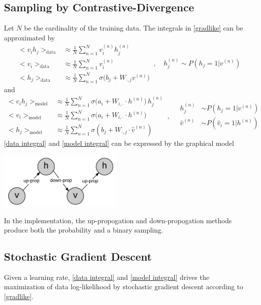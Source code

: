 \documentclass[a4paper,onecolumn]{article}
\theoremstyle{remark}
\begin{document}
\subsection{Sampling by Contrastive-Divergence}
Let $N$ be the cardinality of the training data. The integrals in \eqref{gradlike} can
be approximated by
\begin{equation}\begin{split}
    <v_i h_j>_{\textrm{data}} &\approx \frac{1}{N} \sum_{n=1}^N 
    v_i^{(n)} h_j^{(n)}\\
    <v_i>_{\textrm{data}} &\approx \frac{1}{N} \sum_{n=1}^N v_i^{(n)}\\
    <h_j>_{\textrm{data}} &\approx \frac{1}{N} \sum_{n=1}^N
    \sigma\big(b_j + W_{\cdot,j} v^{(n)}\big)
\end{split}\,,\quad
h_j^{(n)} \sim P(h_j=1\big| v^{(n)})
\label{data integral}
\end{equation}
and
\begin{equation}\begin{split}
    <v_i h_j>_{\textrm{model}} &\approx
    \frac{1}{N} \sum_{n=1}^N  \sigma \big(a_i + W_{i,\cdot}\cdot h^{(n)}\big) \, h_j^{(n)}\\
    <v_i>_{\textrm{model}} &\approx
    \frac{1}{N}\sum_{n=1}^N \sigma \big(a_i + W_{i,\cdot}\cdot h^{(n)}\big) \\
    <h_j>_{\textrm{model}} &\approx \frac{1}{N}\sum_{n=1}^N 
    \sigma(b_j + W_{\cdot, j} \cdot \hat{v}^{(n)})
\end{split}\,,\quad
\begin{split}
h_j^{(n)} &\sim P(h_j=1\big| v^{(n)})\\
\hat{v}^{(n)} &\sim P(\hat{v}_i=1\big| h^{(n)})
\end{split}
\label{model integral}
\end{equation}
\eqref{data integral} and \eqref{model integral} can be expressed by the graphical model 
\begin{center}
        \includegraphics[width=6cm]{CD1.png}
\end{center}
In the implementation, the up-propogation and down-propogation methods produce both the 
probability and a binary sampling.

\subsection{Stochastic Gradient Descent}
Given a learning rate,
\eqref{data integral} and \eqref{model integral} drives the maximization of data log-likelihood
by stochastic gradient descent according to \eqref{gradlike}.
\end{document}
